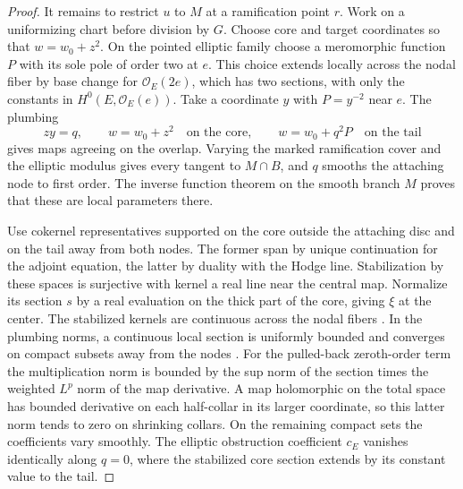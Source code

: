 \begin{proof}
It remains to restrict $u$ to $M$ at a ramification point $r$. Work on
a uniformizing chart before division by $G$. Choose core and target
coordinates so that $w=w_0+z^2$. On the pointed elliptic family choose
a meromorphic function $P$ with its sole pole of order two at $e$.
This choice extends locally across the nodal fiber by base change for
$\mathcal O_E(2e)$, which has two sections, with only the constants
in $H^0(E,\mathcal O_E(e))$. Take a coordinate $y$ with $P=y^{-2}$
near $e$. The plumbing
\begin{equation}\label{p9-eq:tail-plumbing}
 zy=q,\qquad
 w=w_0+z^2\quad\text{on the core},\qquad
 w=w_0+q^2P\quad\text{on the tail}
\end{equation}
gives maps agreeing on the overlap. Varying the marked ramification
cover and the elliptic modulus gives every tangent to $M\cap B$, and $q$
smooths the attaching node to first order. The inverse function theorem
on the smooth branch $M$ proves that these are local parameters there.

Use cokernel representatives supported on the core outside the attaching
disc and on the tail away from both nodes. The former span by unique
continuation for the adjoint equation, the latter by duality with the
Hodge line. Stabilization by these spaces is surjective with kernel a
real line near the central map. Normalize its section $s$ by a real
evaluation on the thick part of the core, giving $\xi$ at the center.
The stabilized kernels are continuous across the nodal fibers
\cite[Appendix~B]{bai}. In the plumbing norms, a continuous local
section is uniformly bounded and converges on compact subsets away from
the nodes \cite[\S\S4.3--4.4, Proposition~4.15]{siebert}. For the
pulled-back zeroth-order term the multiplication norm is bounded by the
sup norm of the section times the weighted $L^p$ norm of the map
derivative. A map holomorphic on the total space has bounded derivative
on each half-collar in its larger coordinate, so this latter norm tends
to zero on shrinking collars. On the remaining compact sets the
coefficients vary smoothly. The elliptic
obstruction coefficient $c_E$ vanishes identically along $q=0$, where
the stabilized core section extends by its constant value to the tail.


\end{proof}

